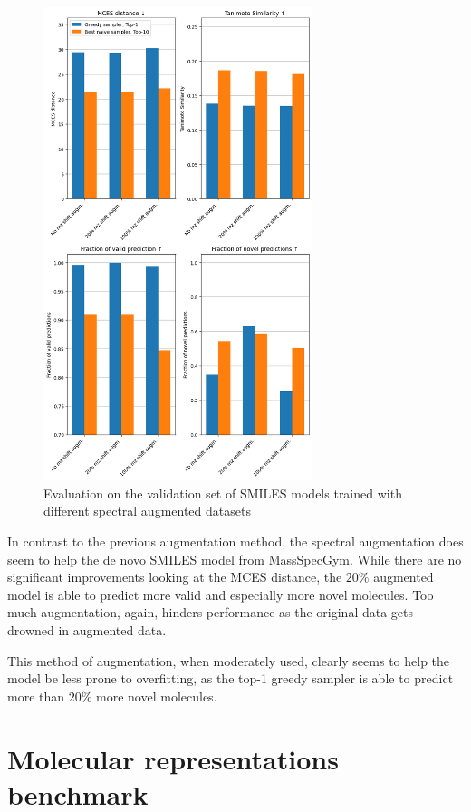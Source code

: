 \begin{figure}[h]
    \centering
    \includegraphics[width=0.7\textwidth]{figures/results/spectrum_augmentation_with_tanimoto.png}
    \caption{Evaluation on the validation set of SMILES models trained with different spectral augmented datasets}
    \label{fig:spectral_augm}
\end{figure}

In contrast to the previous augmentation method, the spectral augmentation does seem to help the de novo SMILES model from MassSpecGym.
While there are no significant improvements looking at the MCES distance, the $20\%$ augmented model is able to predict more valid and especially more novel molecules.
Too much augmentation, again, hinders performance as the original data gets drowned in augmented data.

This method of augmentation, when moderately used, clearly seems to help the model be less prone to overfitting, as the top-1 greedy sampler is able to predict more than $20\%$ more novel molecules. 

\section{Molecular representations benchmark}

